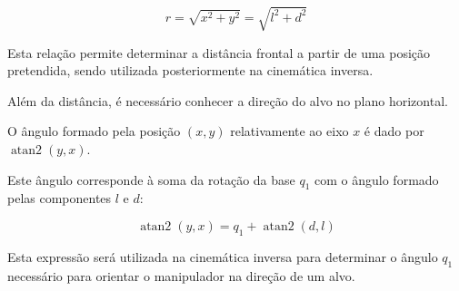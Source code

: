 \begin{equation}
    r=\sqrt{x^2+y^2}=\sqrt{l^2+d^2}
    \label{eq:r}
\end{equation}

Esta relação permite determinar a distância frontal a partir de uma posição pretendida, sendo utilizada posteriormente na cinemática inversa.

Além da distância, é necessário conhecer a direção do alvo no plano horizontal.

O ângulo formado pela posição $(x,y)$ relativamente ao eixo $x$ é dado por $\operatorname{atan2}(y,x)$.

Este ângulo corresponde à soma da rotação da base $q_1$ com o ângulo formado pelas componentes $l$ e $d$:

\begin{equation}
    \operatorname{atan2}(y,x)
    =
    q_1+\operatorname{atan2}(d,l)
    \label{eq:angulo_horizontal}
\end{equation}

Esta expressão será utilizada na cinemática inversa para determinar o ângulo $q_1$ necessário para orientar o manipulador na direção de um alvo.
